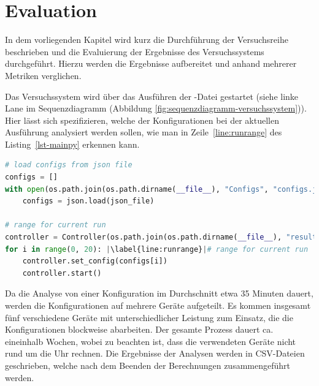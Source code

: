 \section{Evaluation} \label{sec:Evaluation}

In dem vorliegenden Kapitel wird kurz die Durchführung der Versuchsreihe beschrieben und die Evaluierung der Ergebnisse des Versuchssystems durchgeführt.
Hierzu werden die Ergebnisse aufbereitet und anhand mehrerer Metriken verglichen.

Das Versuchssystem wird über das Ausführen der -Datei gestartet (siehe linke Lane im Sequenzdiagramm (Abbildung \ref{fig:sequenzdiagramm-versuchssystem})).
Hier lässt sich spezifizieren, welche der Konfigurationen bei der aktuellen Ausführung analysiert werden sollen, wie man in Zeile~\ref{line:runrange} des Listing~\ref{lst-mainpy} erkennen kann.

\begin{lstlisting}[language=Python,caption=Ausführen einer Versuchsreihe,label=lst-mainpy,escapechar=|]
# load configs from json file
configs = []
with open(os.path.join(os.path.dirname(__file__), "Configs", "configs.json"), "r") as json_file:
    configs = json.load(json_file)

# range for current run
controller = Controller(os.path.join(os.path.dirname(__file__), "results.csv"))
for i in range(0, 20): |\label{line:runrange}|# range for current run
    controller.set_config(configs[i])
    controller.start()
\end{lstlisting}

Da die Analyse von einer Konfiguration im Durchschnitt etwa 35 Minuten dauert, werden die Konfigurationen auf mehrere Geräte aufgeteilt. 
Es kommen insgesamt fünf verschiedene Geräte mit unterschiedlicher Leistung zum Einsatz, die die Konfigurationen blockweise abarbeiten.
Der gesamte Prozess dauert ca. eineinhalb Wochen, wobei zu beachten ist, dass die verwendeten Geräte nicht rund um die Uhr rechnen.
Die Ergebnisse der Analysen werden in CSV-Dateien geschrieben, welche nach dem Beenden der Berechnungen zusammengeführt werden.

\textauthor{\vJB}{}{}

